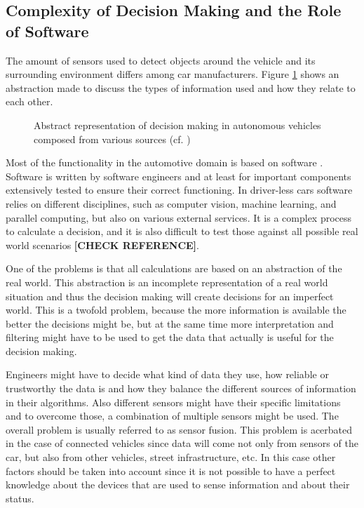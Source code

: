\subsection{Complexity of Decision Making and the Role of Software}
\label{sec:SelfDrivingCarsBasics:ComplexityOfDecisionMaking}

The amount of sensors used to detect objects around the vehicle and its surrounding environment differs among car manufacturers. Figure \ref{fig:DecisionMaking} shows an abstraction made to discuss the types of information used and how they relate to each other. 

\begin{figure}
\caption{Abstract representation of decision making in autonomous vehicles composed from various sources (cf.  \cite{EarthImagingJournalEIJ:RemoteSensingSatelliteImages2012,Waldrop2015,Waymo2017technology,Tesla2016_upgrade})}
\label{fig:DecisionMaking}
\end{figure}

Most of the functionality in the automotive domain is based on software \cite{Broy2007}. Software is written by software engineers and at least for important components extensively tested to ensure their correct functioning. In driver-less cars software relies on different disciplines, such as computer vision, machine learning, and parallel computing, but also on various external services. It is a complex process to calculate a decision, and it is also difficult to test those against all possible real world scenarios \cite{Waldrop2015} \textbf{[CHECK REFERENCE]}. %

One of the problems is that all calculations are based on an abstraction of the real world. This abstraction is an incomplete representation of a real world situation and thus the decision making will create decisions for an imperfect world. This is a twofold problem, because the more information is available the better the decisions might be, but at the same time more interpretation and filtering might have to be used to get the data that actually is useful for the decision making. 

Engineers might have to decide what kind of data they use, how reliable or trustworthy the data is and how they balance the different sources of information in their algorithms. Also different sensors might have their specific limitations and to overcome those, a combination of multiple sensors might be used. The overall problem is usually referred to as sensor fusion. This problem is acerbated in the case of connected vehicles since data will come not only from sensors of the car, but also from other vehicles, street infrastructure, etc. In this case other factors should be taken into account since it is not possible to have a perfect knowledge about the devices that are used to sense information and about their status.

